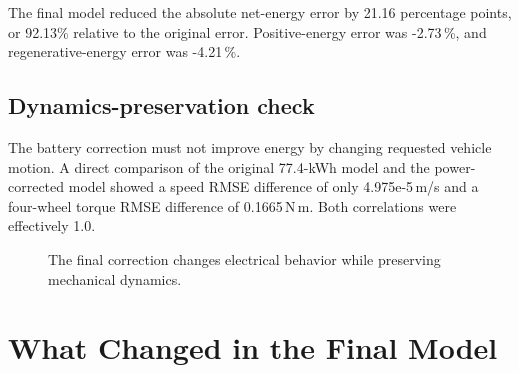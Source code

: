\documentclass[11pt,letterpaper]{article}
\newcommand{\SI}[2]{#1\,#2}
\newcommand{\percent}{\%}
\begin{document}
The final model reduced the absolute net-energy error by 21.16 percentage
points, or 92.13\% relative to the original error. Positive-energy error was
\SI{-2.73}{\percent}, and regenerative-energy error was \SI{-4.21}{\percent}.

\subsection{Dynamics-preservation check}

The battery correction must not improve energy by changing requested vehicle
motion. A direct comparison of the original 77.4-kWh model and the
power-corrected model showed a speed RMSE difference of only
\SI{4.975e-5}{m/s} and a four-wheel torque RMSE difference of
\SI{0.1665}{\ensuremath{\mathrm{N\,m}}}. Both correlations were effectively 1.0.

\begin{figure}[!htbp]
\centering
{}
\caption{The final correction changes electrical behavior while preserving mechanical dynamics.}
\end{figure}

\section{What Changed in the Final Model}
\end{document}
